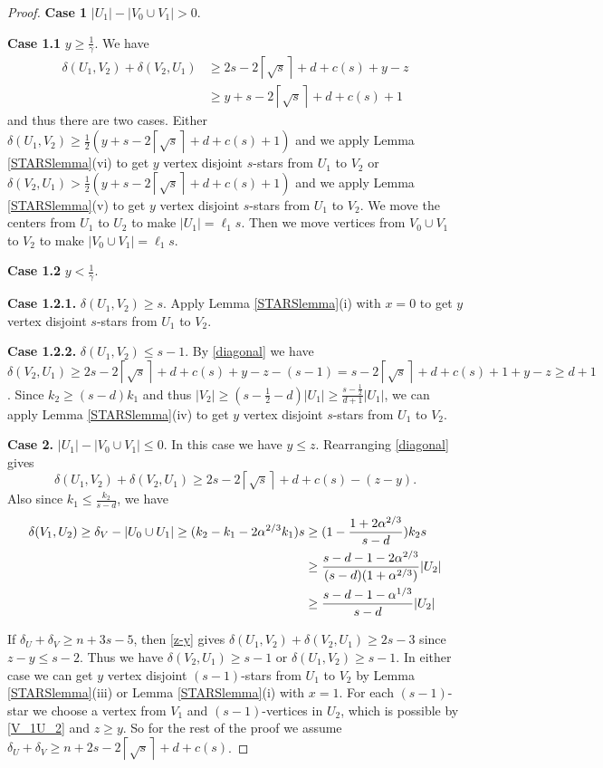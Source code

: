 \documentclass[oneside,12pt]{memoir}
\newcommand{\croot}[1]{\left\lceil\sqrt{#1}\right\rceil}
\begin{document}
\begin{proof}
\noindent
\textbf{Case 1} $|U_1|-|V_0\cup V_1|>0$.

\textbf{Case 1.1} $y\geq \frac{1}{\gamma}$. We have 
\begin{align*}
\delta(U_1,V_2)+\delta(V_2,U_1)&\geq2s-2\croot{s}+d+c(s)+y-z\\
&\geq y+s-2\croot{s}+d+c(s)+1
\end{align*}
and thus there are two cases. Either $\delta(U_1,V_2)\geq \frac{1}{2}(y+s-2\croot{s}+d+c(s)+1)$ and we apply Lemma \ref{STARSlemma}(vi) to get $y$ vertex disjoint $s$-stars from $U_1$ to $V_2$ or $\delta(V_2,U_1)> \frac{1}{2}(y+s-2\croot{s}+d+c(s)+1)$ and we apply Lemma \ref{STARSlemma}(v) to get $y$ vertex disjoint $s$-stars from $U_1$ to $V_2$.  We move the centers from $U_1$ to $U_2$ to make $|U_1|=\ell_1 s$.  Then we move vertices from $V_0\cup V_1$ to $V_2$ to make $|V_0\cup V_1|=\ell_1 s$.

\textbf{Case 1.2} $y<\frac{1}{\gamma}$.


\textbf{Case 1.2.1.} $\delta(U_1,V_2)\geq s$. Apply Lemma \ref{STARSlemma}(i) with $x=0$ to get $y$ vertex disjoint $s$-stars from $U_1$ to $V_2$.

\textbf{Case 1.2.2.} $\delta(U_1,V_2)\leq s-1$.  By \eqref{diagonal} we have $\delta(V_2,U_1)\geq 2s-2\croot{s}+d+c(s)+y-z-(s-1)=s-2\croot{s}+d+c(s)+1+y-z\geq d+1$.  Since $k_2\geq (s-d)k_1$ and thus $|V_2|\geq (s-\frac{1}{2}-d)|U_1|\geq \frac{s-\frac{1}{2}}{d+1}|U_1|$, we can apply Lemma \ref{STARSlemma}(iv) to get $y$ vertex disjoint $s$-stars from $U_1$ to $V_2$.


\textbf{Case 2.} $|U_1|-|V_0\cup V_1|\leq 0$.  In this case we have $y\leq z$.  Rearranging \eqref{diagonal} gives 
\begin{equation}
\delta(U_1,V_2)+\delta(V_2,U_1)\geq 2s-2\croot{s}+d+c(s)-(z-y). \label{z-y}
\end{equation} 
Also since $k_1\leq \frac{k_2}{s-d}$, we have
\begin{align}
\delta(V_1, U_2)\geq \delta_V-|U_0\cup U_1|\geq (k_2-k_1-2\alpha^{2/3}k_1)s
&\geq(1-\frac{1+2\alpha^{2/3}}{s-d})k_2s \notag \\
&\geq  \frac{s-d-1-2\alpha^{2/3}}{(s-d)(1+\alpha^{2/3})}|U_2| \notag \\
&\geq \frac{s-d-1-\alpha^{1/3}}{s-d}|U_2|\label{V_1U_2}
\end{align}  

If $\delta_U+\delta_V\geq n+3s-5$, then \eqref{z-y} gives $\delta(U_1,V_2)+\delta(V_2,U_1)\geq 2s-3$ since $z-y\leq s-2$. Thus we have  $\delta(V_2, U_1)\geq s-1$ or $\delta(U_1, V_2)\geq s-1$.  In either case we can get $y$ vertex disjoint $(s-1)$-stars from $U_1$ to $V_2$ by Lemma \ref{STARSlemma}(iii) or Lemma \ref{STARSlemma}(i) with $x=1$.  For each $(s-1)$-star we choose a vertex from $V_1$ and $(s-1)$-vertices in $U_2$, which is possible by \eqref{V_1U_2} and $z\geq y$.  So for the rest of the proof we assume $\delta_U+\delta_V\geq n+2s-2\croot{s}+d+c(s)$.


\end{proof}
\end{document}
